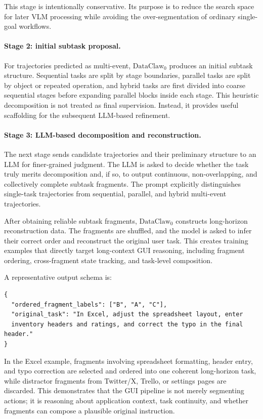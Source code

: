 This stage is intentionally conservative. Its purpose is to reduce the search space for later VLM processing while avoiding the over-segmentation of ordinary single-goal workflows.

\paragraph{Stage 2: initial subtask proposal.}
For trajectories predicted as multi-event, $\text{DataClaw}_0$ produces an initial subtask structure. Sequential tasks are split by stage boundaries, parallel tasks are split by object or repeated operation, and hybrid tasks are first divided into coarse sequential stages before expanding parallel blocks inside each stage. This heuristic decomposition is not treated as final supervision. Instead, it provides useful scaffolding for the subsequent LLM-based refinement.

\paragraph{Stage 3: LLM-based decomposition and reconstruction.}
The next stage sends candidate trajectories and their preliminary structure to an LLM for finer-grained judgment. The LLM is asked to decide whether the task truly merits decomposition and, if so, to output continuous, non-overlapping, and collectively complete subtask fragments. The prompt explicitly distinguishes single-task trajectories from sequential, parallel, and hybrid multi-event trajectories.

After obtaining reliable subtask fragments, $\text{DataClaw}_0$ constructs long-horizon reconstruction data. The fragments are shuffled, and the model is asked to infer their correct order and reconstruct the original user task. This creates training examples that directly target long-context GUI reasoning, including fragment ordering, cross-fragment state tracking, and task-level composition.

A representative output schema is:
\begin{verbatim}
{
  "ordered_fragment_labels": ["B", "A", "C"],
  "original_task": "In Excel, adjust the spreadsheet layout, enter
  inventory headers and ratings, and correct the typo in the final header."
}
\end{verbatim}

In the Excel example, fragments involving spreadsheet formatting, header entry, and typo correction are selected and ordered into one coherent long-horizon task, while distractor fragments from Twitter/X, Trello, or settings pages are discarded. This demonstrates that the GUI pipeline is not merely segmenting actions; it is reasoning about application context, task continuity, and whether fragments can compose a plausible original instruction.

